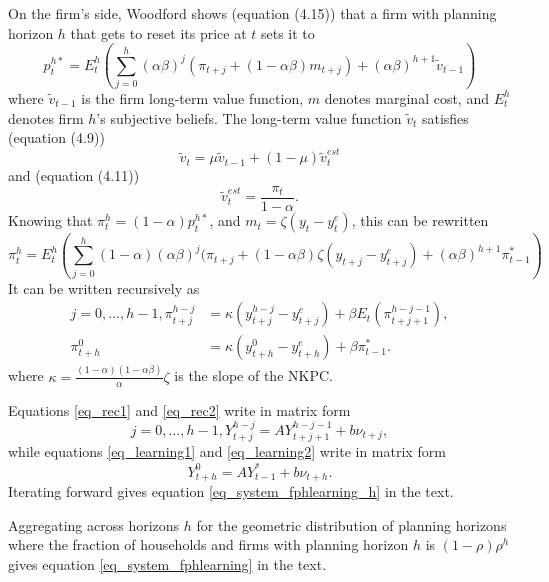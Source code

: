 On the firm's side, Woodford shows (equation (4.15)) that a firm with planning horizon $h$ that gets to reset its price at $t$ sets it to
\begin{equation}
p_t^{h*}= E_t^h \left(\sum_{j=0}^h (\alpha \beta)^j (\pi_{t+j} + (1-\alpha \beta) m_{t+j}) + (\alpha \beta)^{h+1} \tilde{v}_{t-1}\right) 
\end{equation}
where $\tilde{v}_{t-1}$ is the firm long-term value function, $m$ denotes marginal cost, and $E_t^h$ denotes firm $h$'s subjective beliefs.
The long-term value function $\tilde{v}_t$ satisfies (equation (4.9))
\begin{equation}
\tilde{v}_t = \mu \tilde{v}_{t-1} + (1-\mu) \tilde{v}_t^{est}
\end{equation}
and (equation (4.11))
\begin{equation}
\tilde{v}_t^{est} = \frac{\pi_t}{1-\alpha}. 
\end{equation}
Knowing that $\pi_t^h = (1-\alpha) p_t^{h*}$, and $m_t = \zeta (y_t-y_t^e)$, this can be rewritten
\begin{equation}
\pi_t^h = E_t^h \left(\sum_{j=0}^h (1-\alpha) (\alpha \beta)^j (\pi_{t+j} + (1-\alpha \beta) \zeta (y_{t+j}-y_{t+j}^e) + (\alpha \beta)^{h+1} \pi_{t-1}^{*}\right) 
\end{equation}
It can be written recursively as
\begin{align}
j=0,...,h-1, \pi_{t+j}^{h-j} &= \kappa (y_{t+j}^{h-j}-y_{t+j}^e) + \beta E_t(\pi_{t+j+1}^{h-j-1}),\label{eq_rec2}\\
\pi_{t+h}^{0} &= \kappa (y_{t+h}^0-y_{t+h}^e) + \beta \pi_{t-1}^{*}.\label{eq_learning2}
\end{align}
where $\kappa = \frac{(1-\alpha) (1-\alpha \beta)}{\alpha} \zeta$ is the slope of the NKPC.

Equations \eqref{eq_rec1} and \eqref{eq_rec2} write in matrix form
\begin{equation}
j=0,...,h-1, Y_{t+j}^{h-j} = A Y_{t+j+1}^{h-j-1} + b \nu_{t+j},
\end{equation}
while equations \eqref{eq_learning1} and \eqref{eq_learning2} write in matrix form
\begin{equation}
Y_{t+h}^0 = A Y_{t-1}^{*} + b \nu_{t+h}.
\end{equation}
Iterating forward gives equation \eqref{eq_system_fphlearning_h} in the text.

Aggregating across horizons $h$ for the geometric distribution of planning horizons where the fraction of households and firms with planning horizon $h$ is $(1-\rho)\rho^h$ gives equation \eqref{eq_system_fphlearning} in the text.\\

